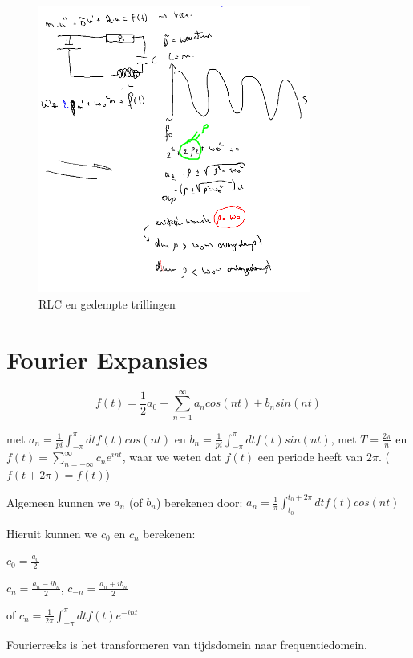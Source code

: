 \documentclass[a4paper]{report}
\begin{document}
\begin{figure}[H]
	\centering
	\includegraphics[width=0.8\textwidth]{assets/rlc-stuff.png}
	\caption{RLC en gedempte trillingen}
	\label{fig:rlc-stuff}
\end{figure}

\chapter{Fourier Expansies}

$$ f(t) = \frac{1}{2} a_0 + \sum_{n=1}^{\infty} a_n cos(nt) + b_n sin(nt) $$

met $a_n = \frac{1}{pi} \int_{-\pi}^{\pi} dt f(t) cos(nt)$
en $b_n = \frac{1}{pi} \int_{-\pi}^{\pi} dt f(t) sin(nt)$, met $T = \frac{2\pi}{n}$
en $f(t) = \sum_{n=-\infty}^{\infty} c_n e^{int}$, waar we weten dat $f(t)$ een periode heeft van $2\pi$. ($f(t + 2\pi) = f(t)$)

Algemeen kunnen we $a_n$ (of $b_n$) berekenen door: $a_n = \frac{1}{\pi} \int_{t_0}^{t_0 + 2\pi} dt f(t) cos(nt)$

Hieruit kunnen we $c_0$ en $c_n$ berekenen:

$c_0 = \frac{a_0}{2}$

$c_n = \frac{a_n - ib_n}{2}$, $c_{-n} = \frac{a_n + ib_n}{2}$

of $c_n = \frac{1}{2\pi} \int_{-\pi}^{\pi} dt f(t) e^{-int}$

Fourierreeks is het transformeren van tijdsdomein naar frequentiedomein.
\end{document}
